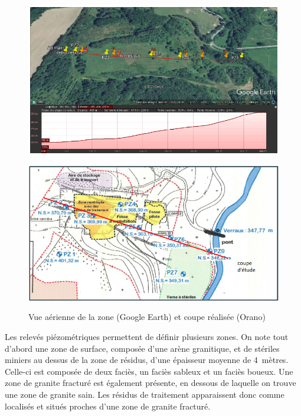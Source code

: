 \documentclass{article}
\begin{document}

\begin{figure}[H]
    \centering
    \begin{minipage}{0.5\textwidth}
        \centering
        \includegraphics[width=1\textwidth]{III_B_3_1.png} 
        \label{fig:earth_ribière}
    \end{minipage}\hfill
    \begin{minipage}{0.5\textwidth}
        \centering
        \includegraphics[width=1\textwidth]{III_B_3_2.png} 
        \label{fig:coupe_ribiere}
    \end{minipage}
    \caption{Vue aérienne de la zone (Google Earth) et coupe réalisée (Orano)\cite{societe_areva_nc_etude_2011} }
\end{figure}


Les relevés piézométriques permettent de définir plusieurs zones. On note tout d’abord une zone de surface, composée d’une arène granitique, et de stériles miniers au dessus de la zone de résidus, d’une épaisseur moyenne de 4~mètres. Celle-ci est composée de deux faciès, un faciès sableux et un faciès boueux. Une zone de granite fracturé est également présente, en dessous de laquelle on trouve une zone de granite sain. Les résidus de traitement apparaissent donc comme localisés et situés proches d’une zone de granite fracturé.
\end{document}
